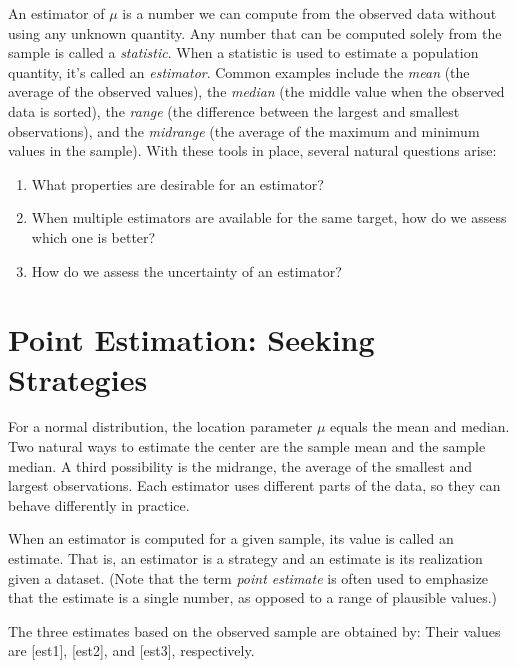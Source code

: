 An estimator of $\mu$ is a number we can compute from the observed data
without using any unknown quantity. Any number that can be computed
solely from the sample is called a \emph{statistic}. 
When a statistic is used to estimate a population quantity, it's called an
\emph{estimator}.  Common examples include the 
\emph{mean} (the average of the observed values), the \emph{median} 
(the middle value when the observed data is sorted), the \emph{range}
(the difference between the largest and smallest observations), and the 
\emph{midrange} (the average of the maximum and minimum values in the sample).  
With these tools in place, several natural questions arise:
\begin{enumerate}
\item What properties are desirable for an estimator?
\item When multiple estimators are available for the same target, how do we 
      assess which one is better?
\item How do we assess the uncertainty of an estimator?
\end{enumerate}


\section{Point Estimation: Seeking Strategies}

For a normal distribution, the location parameter $\mu$ equals the mean and
median. Two natural ways to estimate the center are the sample mean and the
sample median. A third possibility is the midrange, the average of the smallest
and largest observations. Each estimator uses different parts of the data,
so they can behave differently in practice. 

When an estimator is computed for a given sample, its value is called an
estimate. That is, an estimator is a strategy and an estimate is
its realization given a dataset. (Note that the term \emph{point estimate} is
often used to emphasize that the estimate is a single number, as opposed to a
range of plausible values.)


The three estimates based on the observed sample are obtained by:
Their values are [est1],
[est2], and
[est3], respectively.



